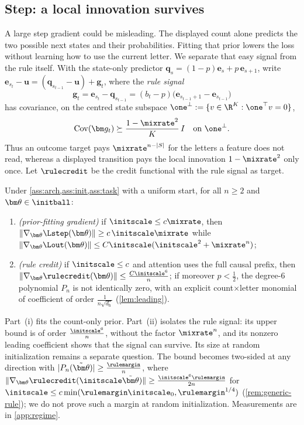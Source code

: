 \subsection{Step: a local innovation survives}
A large step gradient could be misleading. The displayed count alone predicts the two possible next states and their probabilities.
Fitting that prior lowers the loss without learning how to use the current letter. We separate that easy signal from the rule itself. With the
state-only predictor $\bm q_s=(1-p)\bm e_s+p\,\bm e_{s+1}$, write $\bm e_{s_t}-\bm u=(\bm q_{s_{t-1}}-\bm u)+\bm g_t$, where the
\emph{rule signal}
\[
 \bm g_t=\bm e_{s_t}-\bm q_{s_{t-1}}=(b_t-p)\bigl(\bm e_{s_{t-1}+1}-\bm e_{s_{t-1}}\bigr)
\]
has covariance, on the centred state subspace $\one^\perp:=\{v\in\R^K:\one^\top v=0\}$,
\begin{equation}
 \operatorname{Cov}(\bm g_t)\succeq\frac{1-\mixrate^2}{K}\,I
 \quad\text{on }\one^\perp.
 \label{eq:local-variation}
\end{equation}
Thus an outcome target pays $\mixrate^{n-|S|}$ for the letters a feature does not read, whereas a displayed transition pays the
local innovation $1-\mixrate^2$ only once. Let $\rulecredit$ be the credit
functional with the rule signal as target.

\begin{theorem}
\label{thm:separation}
Under \cref{ass:arch,ass:init,ass:task} with a uniform start, for all $n\ge2$ and $\bm\theta\in\initball$:
\begin{enumerate}[label=(\roman*),leftmargin=*,itemsep=0pt,topsep=2pt]
\item \emph{(prior-fitting gradient)} if $\initscale\le c\mixrate$, then $\|\nabla_{\bm\theta}\Lstep(\bm\theta)\|\ge c\,\initscale\mixrate$ while
$\|\nabla_{\bm\theta}\Lout(\bm\theta)\|\le C\initscale(\initscale^2+\mixrate^n)$;
\item \emph{(rule credit)} if $\initscale\le c$ and attention uses the full causal prefix, then $\|\nabla_{\bm\theta}\rulecredit(\bm\theta)\|\le \frac{C\initscale^6}{n}$; if
moreover $p<\tfrac{1}{2}$, the degree-$6$ polynomial $P_n$ is not identically zero, with an explicit count$\times$letter monomial of
coefficient of order $\frac{1}{n\sqrt{d_{\mathrm h}}}$
(\cref{lem:leading}).
\end{enumerate}
\end{theorem}

Part~(i) fits the count-only prior. Part~(ii) isolates the rule signal: its upper bound is of order $\frac{\initscale^6}{n}$, without
the factor $\mixrate^n$, and its nonzero leading coefficient shows that the signal can survive. Its size at random initialization
remains a separate question. The bound becomes two-sided at any direction with
$|P_n(\tilde{\bm\theta})|\ge\frac{\rulemargin}{n}$, where $\|\nabla_{\bm\theta}\rulecredit(\initscale\tilde{\bm\theta})\|\ge\frac{\initscale^6\rulemargin}{2n}$ for
$\initscale\le c\min(\rulemargin\initscale_0,\rulemargin^{1/4})$ (\cref{rem:generic-rule}); we do not prove such a margin at random
initialization. Measurements are in \cref{app:regime}.

